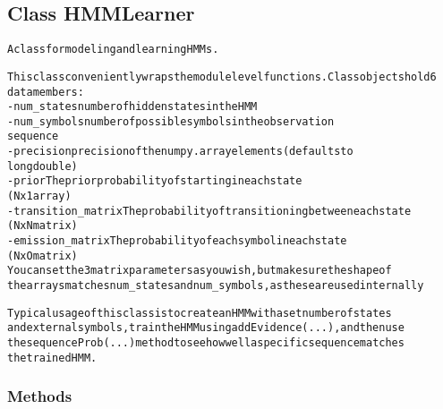 \subsection{Class HMMLearner}

    \label{QSTK:qstklearn:hmm:HMMLearner}
\begin{alltt}

A class for modeling and learning HMMs.

This class conveniently wraps the module level functions. Class objects hold 6
data members:
- num\_states                    number of hidden states in the HMM
- num\_symbols                   number of possible symbols in the observation 
                                sequence
- precision                     precision of the numpy.array elements (defaults to
                                longdouble)
- prior                         The prior probability of starting in each state
                                (Nx1 array)
- transition\_matrix             The probability of transitioning between each state
                                (NxN matrix)
- emission\_matrix               The probability of each symbol in each state
                                (NxO matrix)
You can set the 3 matrix parameters as you wish, but make sure the shape of
the arrays matches num\_states and num\_symbols, as these are used internally

Typical usage of this class is to create an HMM with a set number of states
and external symbols, train the HMM using addEvidence(...), and then use
the sequenceProb(...) method to see how well a specific sequence matches
the trained HMM.
\end{alltt}



  \subsubsection{Methods}

    \label{QSTK:qstklearn:hmm:HMMLearner:__init__}

    \vspace{0.5ex}

